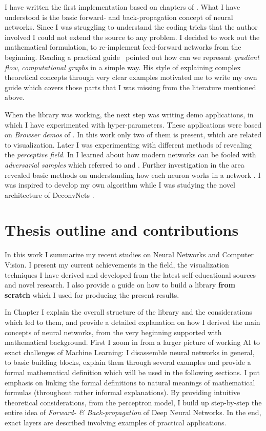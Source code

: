 I have written the first implementation based on chapters of \cite{nnsdl}. 
What I have understood is the basic forward- and back-propagation \cite{werbos1994roots} concept of neural networks.
Since I was struggling to understand the coding tricks that the author involved 
I could not extend the source to any problem.
I decided to work out the mathematical formulation, to re-implement feed-forward networks from the beginning.
Reading a practical guide~\cite{karpathyblog} pointed out how can we represent \emph{gradient flow}, \emph{computational graphs} in a simple way.
His style of explaining complex theoretical concepts through very clear examples motivated me to
write my own guide which covers those parts that I was missing from the literature mentioned above.

When the library was working, the next step was writing demo applications, in which I have experimented with hyper-parameters.
These applications were based on \emph{Browser demos} of \cite{convnetjs}.
In this work only two of them is present, which are related to visualization.
Later I was experimenting with different methods of revealing the \emph{perceptive field}.
In \cite{breakingclass} I learned about how modern networks can be fooled with \emph{adversarial samples} which referred to \cite{goodfellow2014explaining} and \cite{nguyen2015deep}. 
Further investigation in the area revealed basic methods on understanding how each neuron works in a network \cite{yosinski2015understanding}.
I was inspired to develop my own algorithm while I was studying the novel architecture of DeconvNets \cite{zeiler2014visualizing}.

\clearpage
\section{Thesis outline and contributions}
In this work I summarize my recent studies on Neural Networks and Computer 
Vision. 
I present my current achievements in the field, the visualization 
techniques I have derived and developed from the latest 
self-educational sources and novel research.
I also provide a guide on how to build a library \textbf{from scratch} 
which I used for producing the present results.


In Chapter \textbf{} I explain the overall structure of the library and the considerations which led to them, and provide a detailed explanation on how I 
derived the main concepts of neural networks, from the very beginning supported with mathematical background. 
First I zoom in from a larger picture of working AI to exact challenges of 
Machine Learning: I disassemble neural networks in general, to basic 
building blocks, explain them through several examples and provide a 
formal mathematical definition which will be used in the following 
sections.
I put emphasis on linking the formal definitions to natural meanings of 
mathematical formulas (throughout rather informal explanations).
By providing intuitive theoretical considerations, from the perceptron 
model, I build up step-by-step the entire idea of \emph{Forward- \& 
Back-propagation} of Deep Neural Networks.
In the end, exact layers are described involving examples of practical applications.

